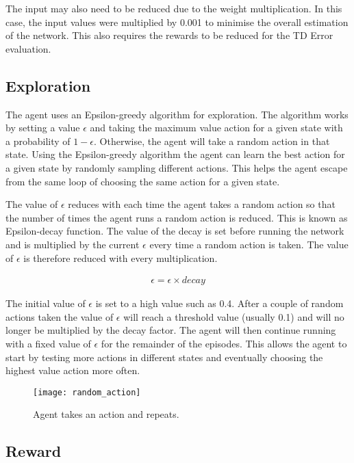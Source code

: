 The input may also need to be reduced due to the weight multiplication. In this
case, the input values were multiplied by 0.001 to minimise the overall
estimation of the network. This also requires the rewards to be reduced for the
TD Error evaluation.

\subsection{Exploration}

The agent uses an Epsilon-greedy algorithm for exploration. The algorithm works
by setting a value $\epsilon$ and taking the maximum value action for a given
state with a probability of $1-\epsilon$. Otherwise, the agent will take a random
action in that state. Using the Epsilon-greedy algorithm the agent can
learn the best action for a given state by randomly sampling different actions.
This helps the agent escape from the same loop of choosing the same action for a
given state.

The value of $\epsilon$ reduces with each time the agent takes a random action
so that the number of times the agent runs a random action is reduced. This is
known as Epsilon-decay function. The value of the decay is set before running
the network and is multiplied by the current $\epsilon$ every time a random
action is taken. The value of $\epsilon$ is therefore reduced with every
multiplication.

\begin{align}
    \epsilon = \epsilon \times decay
\end{align}

The initial value of $\epsilon$ is set to a high value such as 0.4. After a couple
of random actions taken the value of $\epsilon$ will reach a threshold value
(usually 0.1) and will no longer be multiplied by the decay factor. The agent
will then continue running with a fixed value of $\epsilon$ for the remainder of
the episodes. This allows the agent to start by testing more actions in
different states and eventually choosing the highest value action more often.

\begin{figure}[h]
    \centering
    \texttt{[image: random\_action]}
    \caption{Agent takes an action and repeats.}%
    \label{fig:random_action}
\end{figure}

\subsection{Reward}

